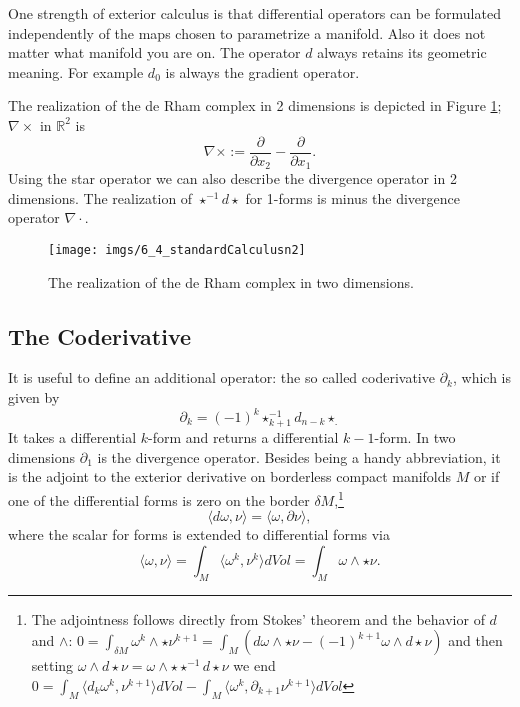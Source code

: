 One strength of exterior calculus is that differential operators can be formulated independently of the maps chosen to parametrize a manifold. Also it does not matter what manifold you are on. The operator $d$ always retains its geometric meaning. For example $d_0$ is always the gradient operator.

The realization of the de Rham complex in 2 dimensions is depicted in Figure \ref{fig:deRham2d}; $\nabla \times$ in $\mathbb R^2$ is
\[\nabla \times := \frac{\partial}{\partial x_2} - \frac{\partial}{\partial x_1}.\] 
Using the star operator we can also describe the divergence operator in 2 dimensions. The realization of $\star^{-1} d \star$ for 1-forms is minus the divergence operator $\nabla\cdot$.

\begin{figure}
\begin{center}
\texttt{[image: imgs/6\_4\_standardCalculusn2]}
\end{center}
\caption{The realization of the de Rham complex in two dimensions.}
\label{fig:deRham2d}
\end{figure}

\subsection{The Coderivative}
\label{subsec::coderivativ}
It is useful to define an additional operator: the so called coderivative $\partial_k$, which is given by
\[\partial_k = (-1)^{k}\star^{-1}_{k+1}d_{n-k}\star_.\]
It takes a differential $k$-form and returns a differential $k-1$-form. In two dimensions $\partial_1$ is the divergence operator. Besides being a handy abbreviation, it is the adjoint to the exterior derivative on borderless compact manifolds $M$ or if one of the differential forms is zero on the border $\delta M$,\footnote{The adjointness follows directly from Stokes' theorem and the behavior of $d$ and $\wedge$: $0=\int_{\delta M} \omega^k\wedge \star \nu^{k+1} = \int_M (d\omega\wedge\star \nu - (-1)^{k+1}\omega\wedge d\star \nu)$ and then setting $\omega\wedge d\star\nu = \omega\wedge \star \star^{-1} d\star\nu$ we end $0= \int_M \langle d_k\omega^k,\nu^{k+1}\rangle dVol  - \int_M \langle \omega^k,\partial_{k+1}\nu^{k+1} \rangle dVol$}
\begin{equation}\langle d\omega, \nu\rangle = \langle \omega , \partial \nu \rangle, \end{equation}
where the scalar for forms is extended to differential forms via
\[\langle \omega, \nu \rangle = \int_{M} \langle\omega^k,\nu^k\rangle dVol = \int_{M} \omega \wedge \star \nu.\]

